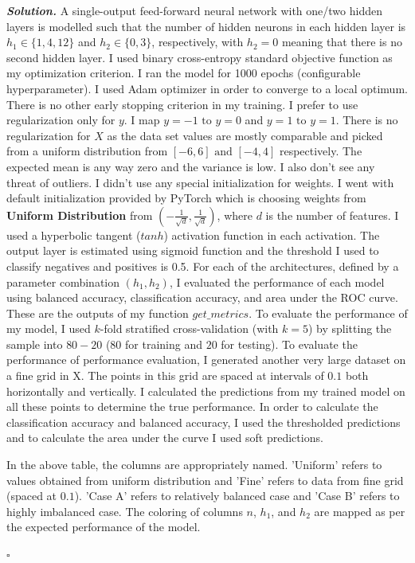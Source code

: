 \documentclass[10pt]{article}
\newenvironment{solution}[1][\it{Solution}]{\textbf{#1. } }{$\square$}
\begin{document}
\begin{solution}
A single-output feed-forward neural network with one/two hidden layers is modelled such that the number of hidden neurons in each hidden layer is $h_1 \in \{1, 4, 12\}$ and $h_2 \in \{0, 3\}$, respectively, with $h_2 = 0$ meaning that there is no second hidden layer. I used binary cross-entropy standard objective function as my optimization criterion. I ran the model for 1000 epochs (configurable hyperparameter). I used Adam optimizer in order to converge to a local optimum. There is no other early stopping criterion in my training. I prefer to use regularization only for $y$. I map $y = -1 \text{ to } y = 0$ and $y = 1 \text{ to } y = 1$. There is no regularization for $X$ as the data set values are mostly comparable and picked from a uniform distribution from $[-6, 6] \text{ and } [-4, 4]$ respectively. The expected mean is any way zero and the variance is low. I also don't see any threat of outliers. I didn't use any special initialization for weights. I went with default initialization provided by PyTorch which is choosing weights from \textbf{Uniform Distribution} from $\left(-\frac{1}{\sqrt{d}}, \frac{1}{\sqrt{d}}\right)$, where $d$ is the number of features. I used a hyperbolic tangent ($tanh$) activation function in each activation. The output layer is estimated using sigmoid function and the threshold I used to classify negatives and positives is 0.5. For each of the architectures, defined by a parameter combination $(h_1, h_2)$, I evaluated the performance of each model using balanced accuracy, classification accuracy, and area under the ROC curve. These are the outputs of my function $get\_metrics$. To evaluate the performance of my model, I used $k$-fold stratified cross-validation (with $k = 5$) by splitting the sample into $80-20$ ($80$ for training and $20$ for testing). To evaluate the performance of performance evaluation, I generated another very large dataset on a fine grid in X. The points in this grid are spaced at intervals of $0.1$ both horizontally and vertically. I calculated the predictions from my trained model on all these points to determine the true performance. In order to calculate the classification accuracy and balanced accuracy, I used the thresholded predictions and to calculate the area under the curve I used soft predictions.

In the above table, the columns are appropriately named. 'Uniform' refers to values obtained from uniform distribution and 'Fine' refers to data from fine grid (spaced at $0.1$). 'Case A' refers to relatively balanced case and 'Case B' refers to highly imbalanced case. The coloring of columns $n$, $h_1$, and $h_2$ are mapped as per the expected performance of the model.



\end{solution}
\end{document}
